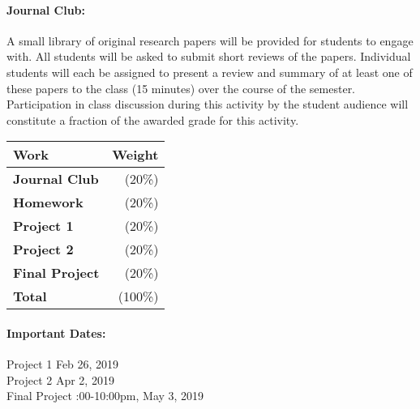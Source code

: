 \documentclass[11pt]{article}
\begin{document}
\paragraph{Journal Club:} A small library of original research papers will be 
provided for students to engage with. All students will be asked to submit 
short reviews of the papers. Individual students will each be assigned to 
present a review and summary of at least one of these papers to the class (15 
minutes) over the course of the semester.  Participation in class discussion 
during this activity by the student audience will constitute a fraction of the 
awarded grade for this activity.

\begin{table}[h]
\begin{tabularx}{\textwidth}{Xr}
        \textbf{Work} & \textbf{Weight} \\
\hline
\textbf{Journal Club}    & (20\%)  \\
\textbf{Homework}    & (20\%)  \\
\textbf{Project 1}    & (20\%)  \\
\textbf{Project 2}    & (20\%)  \\
\textbf{Final Project}  & (20\%)  \\
\hline
\textbf{Total}       & (100\%)\\
\end{tabularx}
\end{table}

\paragraph{Important Dates:}
\begin{center} \begin{minipage}{3.8in}
\begin{flushleft}
Project 1    \dotfill  Feb 26, 2019\\
Project 2  \dotfill  Apr 2, 2019\\
Final Project    :00-10:00pm, May 3, 2019\\
\end{flushleft}
\end{minipage}
\end{center}
\end{document}
